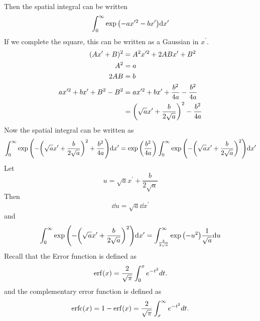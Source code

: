 \documentclass[letterpaper,10pt]{article}
\DeclareMathOperator{\erfc}{erfc}
\begin{document}
Then the spatial integral can be written
\begin{equation}
  \label{eq:spatial_int}
  \int_{0}^{\infty}
  \exp\qty(
  -a x^{\prime 2}
  -b x^{\prime}
  )
  \dd x^\prime
\end{equation}
If we complete the square, this can be written as a Gaussian in $x^\prime$.
\begin{align}
  (Ax^\prime + B)^2 &= A^2x^{\prime 2} + 2ABx^\prime + B^2 \\
  A^2 &= a \\
  2AB &= b \\
  ax^{\prime 2} + bx^\prime + B^2 - B^2
      &=
      ax^{\prime 2} + bx^\prime + \frac{b^2}{4a} - \frac{b^2}{4a} \\
      &=
      \qty(\sqrt{a}x^\prime + \frac{b}{2\sqrt{a}})^2 - \frac{b^2}{4a}
    \end{align}
    Now the spatial integral can be written as
    \begin{equation}
      \int_{0}^{\infty}
      \exp \qty(-\qty(\sqrt{a}x^\prime + \frac{b}{2\sqrt{a}})^2 + \frac{b^2}{4a})
      \dd x^\prime
      =
      \exp \qty(\frac{b^2}{4a} )
      \int_{0}^{\infty}
      \exp \qty(-\qty(\sqrt{a}x^\prime + \frac{b}{2\sqrt{a}})^2)
      \dd x^\prime
    \end{equation}
    Let
    \begin{equation}
      u
      =
      \sqrt{a}x^\prime + \frac{b}{2\sqrt{a}}
    \end{equation}
    Then
    \begin{equation}
      \dd u
      =
      \sqrt{a} \dd x^\prime
    \end{equation}
    and
    \begin{equation}
      \int_{0}^{\infty}
      \exp \qty(-\qty(\sqrt{a}x^\prime + \frac{b}{2\sqrt{a}})^2)
      \dd x^\prime
      =
      \int_{\frac{b}{2\sqrt{a}}}^{\infty}
      \exp \qty(-u^2)
      \frac{1}{\sqrt{a}}\dd u
    \end{equation}
    Recall that the Error function is defined as
    \begin{equation}
      \erf(x) = \frac{2}{\sqrt{\pi}} \int_0^x e^{-t^2} dt.
    \end{equation}
    and the complementary error function is defined as
    \begin{equation}
      \erfc(x) = 1 - \erf(x) = \frac{2}{\sqrt{\pi}} \int_x^\infty e^{-t^2} dt.
    \end{equation}
\end{document}
